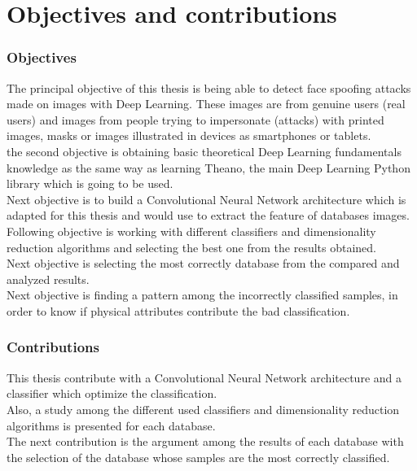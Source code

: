 \section{Objectives and contributions}
\subsubsection{Objectives}
The principal objective of this thesis is being able to detect face spoofing attacks made on images with Deep Learning. These images are from genuine users (real users) and images from people trying to impersonate (attacks) with printed images, masks or images illustrated in devices as smartphones or tablets.\\

the second objective is obtaining basic theoretical Deep Learning fundamentals knowledge as the same way as learning Theano, the main Deep Learning Python library which is going to be used.\\

Next objective is to build a Convolutional Neural Network architecture which is adapted for this thesis and would use to extract the feature of databases images.\\

Following objective is working with different classifiers and dimensionality reduction algorithms and selecting the best one from the results obtained.\\

Next objective is selecting the most correctly database from the compared and analyzed results.\\

Next objective is finding a pattern among the incorrectly classified samples, in order to know if physical attributes contribute the bad classification.\\

\subsubsection{Contributions}
This thesis contribute with a Convolutional Neural Network architecture and a classifier which optimize the classification.\\

Also, a study among the different used classifiers and dimensionality reduction algorithms is presented for each database.\\

The next contribution is the argument among the results of each database with the selection of the database whose samples are the most correctly classified.\\

